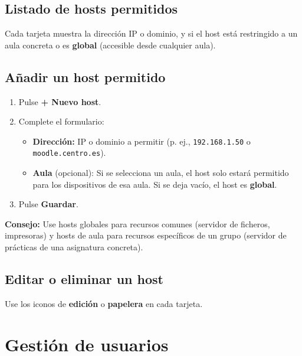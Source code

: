 \documentclass[12pt,a4paper]{article}
\begin{document}
\subsection{Listado de hosts permitidos}

Cada tarjeta muestra la dirección IP o dominio, y si el host está restringido a un aula concreta o es \textbf{global} (accesible desde cualquier aula).

\subsection{Añadir un host permitido}

\begin{enumerate}
    \item Pulse \textbf{+ Nuevo host}.
    \item Complete el formulario:
    \begin{itemize}
        \item \textbf{Dirección:} IP o dominio a permitir (p. ej., \texttt{192.168.1.50} o \texttt{moodle.centro.es}).
        \item \textbf{Aula} (opcional): Si se selecciona un aula, el host solo estará permitido para los dispositivos de esa aula. Si se deja vacío, el host es \textbf{global}.
    \end{itemize}
    \item Pulse \textbf{Guardar}.
\end{enumerate}

\begin{tipnote}
\textbf{Consejo:} Use hosts globales para recursos comunes (servidor de ficheros, impresoras) y hosts de aula para recursos específicos de un grupo (servidor de prácticas de una asignatura concreta).
\end{tipnote}

\subsection{Editar o eliminar un host}

Use los iconos de \textbf{edición} o \textbf{papelera} en cada tarjeta.

\section{Gestión de usuarios}
\end{document}
